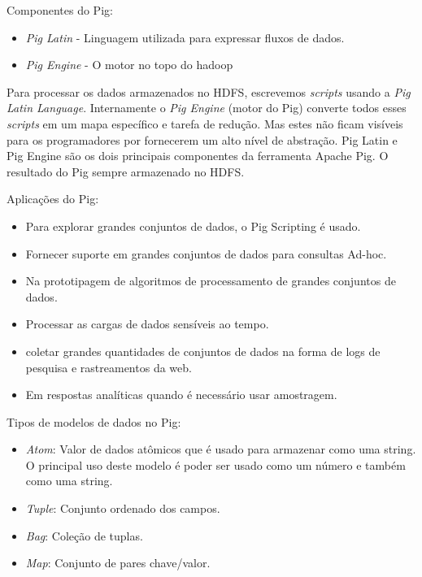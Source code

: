 \documentclass[a4paper,11pt]{article}
\begin{document}
Componentes do Pig: \vspace{-1em}
\begin{itemize}
	\item \textit{Pig Latin} - Linguagem utilizada para expressar fluxos de dados.
	\item \textit{Pig Engine} - O motor no topo do hadoop
\end{itemize}
	
Para processar os dados armazenados no HDFS, escrevemos \textit{scripts} usando a \textit{Pig Latin Language}. Internamente o \textit{Pig Engine} (motor do Pig) converte todos esses \textit{scripts} em um mapa específico e tarefa de redução. Mas estes não ficam visíveis para os programadores por fornecerem um alto nível de abstração. Pig Latin e Pig Engine são os dois principais componentes da ferramenta Apache Pig. O resultado do Pig sempre armazenado no HDFS.	

Aplicações do Pig: \vspace{-1em}
\begin{itemize}
	\item Para explorar grandes conjuntos de dados, o Pig Scripting é usado.
	\item Fornecer suporte em grandes conjuntos de dados para consultas Ad-hoc.
    \item Na prototipagem de algoritmos de processamento de grandes conjuntos de dados.
    \item Processar as cargas de dados sensíveis ao tempo.
    \item coletar grandes quantidades de conjuntos de dados na forma de logs de pesquisa e rastreamentos da web.
    \item Em respostas analíticas quando é necessário usar amostragem.
\end{itemize}

Tipos de modelos de dados no Pig: \vspace{-1em}
\begin{itemize}
	\item \textit{Atom}: Valor de dados atômicos que é usado para armazenar como uma string. O principal uso deste modelo é poder ser usado como um número e também como uma string.
	\item \textit{Tuple}: Conjunto ordenado dos campos.
	\item \textit{Bag}: Coleção de tuplas.
	\item \textit{Map}: Conjunto de pares chave/valor.
\end{itemize}
\end{document}
